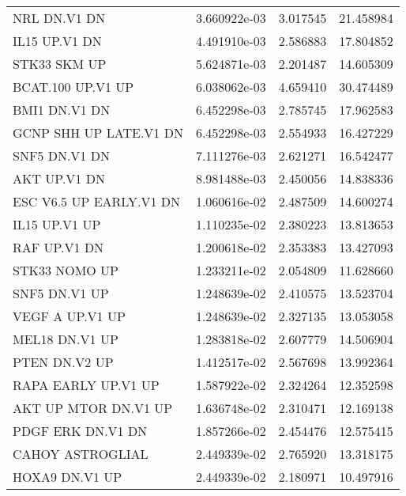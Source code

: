 \begin{tabular}{lrrr}
                      NRL DN.V1 DN &      3.660922e-03 &  3.017545 &       21.458984 \\
                     IL15 UP.V1 DN &      4.491910e-03 &  2.586883 &       17.804852 \\
                      STK33 SKM UP &      5.624871e-03 &  2.201487 &       14.605309 \\
                 BCAT.100 UP.V1 UP &      6.038062e-03 &  4.659410 &       30.474489 \\
                     BMI1 DN.V1 DN &      6.452298e-03 &  2.785745 &       17.962583 \\
            GCNP SHH UP LATE.V1 DN &      6.452298e-03 &  2.554933 &       16.427229 \\
                     SNF5 DN.V1 DN &      7.111276e-03 &  2.621271 &       16.542477 \\
                      AKT UP.V1 DN &      8.981488e-03 &  2.450056 &       14.838336 \\
           ESC V6.5 UP EARLY.V1 DN &      1.060616e-02 &  2.487509 &       14.600274 \\
                     IL15 UP.V1 UP &      1.110235e-02 &  2.380223 &       13.813653 \\
                      RAF UP.V1 DN &      1.200618e-02 &  2.353383 &       13.427093 \\
                     STK33 NOMO UP &      1.233211e-02 &  2.054809 &       11.628660 \\
                     SNF5 DN.V1 UP &      1.248639e-02 &  2.410575 &       13.523704 \\
                   VEGF A UP.V1 UP &      1.248639e-02 &  2.327135 &       13.053058 \\
                    MEL18 DN.V1 UP &      1.283818e-02 &  2.607779 &       14.506904 \\
                     PTEN DN.V2 UP &      1.412517e-02 &  2.567698 &       13.992364 \\
               RAPA EARLY UP.V1 UP &      1.587922e-02 &  2.324264 &       12.352598 \\
              AKT UP MTOR DN.V1 UP &      1.636748e-02 &  2.310471 &       12.169138 \\
                 PDGF ERK DN.V1 DN &      1.857266e-02 &  2.454476 &       12.575415 \\
                  CAHOY ASTROGLIAL &      2.449339e-02 &  2.765920 &       13.318175 \\
                    HOXA9 DN.V1 UP &      2.449339e-02 &  2.180971 &       10.497916 \\

\end{tabular}
